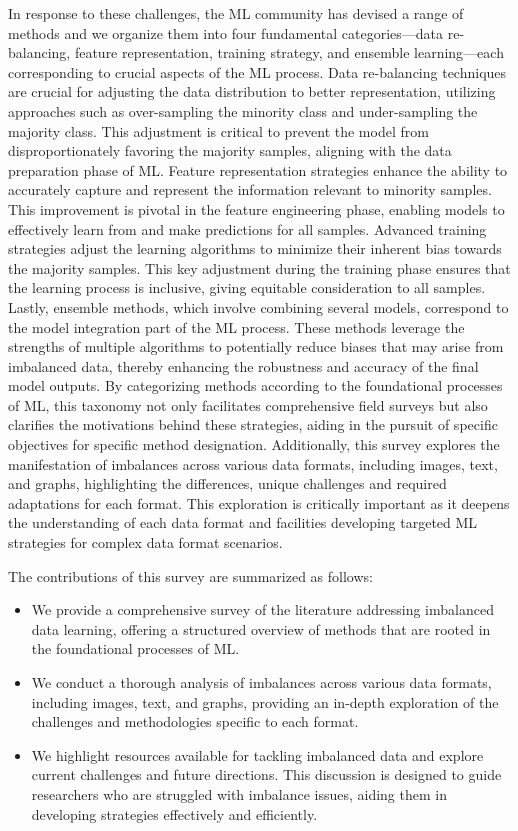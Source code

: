 In response to these challenges, the ML community has devised a range of methods and we organize them into four fundamental categories—data re-balancing, feature representation, training strategy, and ensemble learning—each corresponding to crucial aspects of the ML process.
Data re-balancing techniques are crucial for adjusting the data distribution to better representation, utilizing approaches such as over-sampling the minority class and under-sampling the majority class. This adjustment is critical to prevent the model from disproportionately favoring the majority samples, aligning with the data preparation phase of ML.
Feature representation strategies enhance the ability to accurately capture and represent the information relevant to minority samples. This improvement is pivotal in the feature engineering phase, enabling models to effectively learn from and make predictions for all samples.
Advanced training strategies adjust the learning algorithms to minimize their inherent bias towards the majority samples. This key adjustment during the training phase ensures that the learning process is inclusive, giving equitable consideration to all samples.
Lastly, ensemble methods, which involve combining several models, correspond to the model integration part of the ML process. These methods leverage the strengths of multiple algorithms to potentially reduce biases that may arise from imbalanced data, thereby enhancing the robustness and accuracy of the final model outputs.
By categorizing methods according to the foundational processes of ML, this taxonomy not only facilitates comprehensive field surveys but also clarifies the motivations behind these strategies, aiding in the pursuit of specific objectives for specific method designation.
Additionally, this survey explores the manifestation of imbalances across various data formats, including images, text, and graphs, highlighting the differences, unique challenges and required adaptations for each format. This exploration is critically important as it deepens the understanding of each data format and facilities developing targeted ML strategies for complex data format scenarios.


The contributions of this survey are summarized as follows:
\begin{itemize}
\item We provide a comprehensive survey of the literature addressing imbalanced data learning, offering a structured overview of methods that are rooted in the foundational processes of ML.
\item We conduct a thorough analysis of imbalances across various data formats, including images, text, and graphs, providing an in-depth exploration of the challenges and methodologies specific to each format.
\item We highlight resources available for tackling imbalanced data and explore current challenges and future directions. This discussion is designed to guide researchers who are struggled with imbalance issues, aiding them in developing strategies effectively and efficiently.
\end{itemize}

